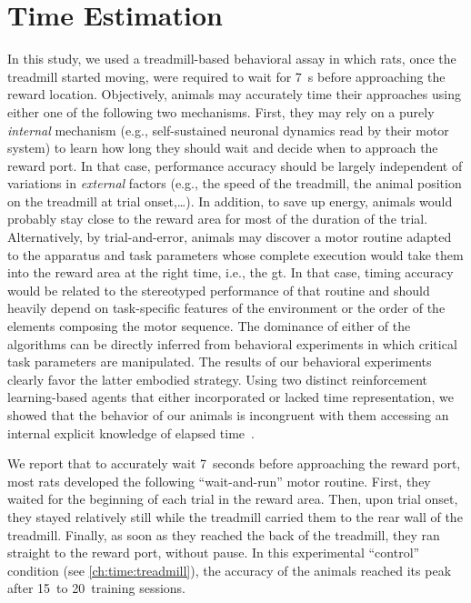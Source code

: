 \section{Time Estimation}
\label{ch:disscusion:time}

In this study, we used a treadmill-based behavioral assay in which rats, once the treadmill started moving, were required to wait for 7~s before approaching the reward location.
Objectively, animals may accurately time their approaches using either one of the following two mechanisms.
First, they may rely on a purely \textit{internal} mechanism (e.g., self-sustained neuronal dynamics read by their motor system) to learn how long they should wait and decide when to approach the reward port.
In that case, performance accuracy should be largely independent of variations in \textit{external} factors (e.g., the speed of the treadmill, the animal position on the treadmill at trial onset,\ldots).
In addition, to save up energy, animals would probably stay close to the reward area for most of the duration of the trial.
Alternatively, by trial-and-error, animals may discover a motor routine adapted to the apparatus and task parameters whose complete execution would take them into the reward area at the right time, i.e., the \gls{gt}.
In that case, timing accuracy would be related to the stereotyped performance of that routine and should heavily depend on task-specific features of the environment or the order of the elements composing the motor sequence.
The dominance of either of the algorithms can be directly inferred from behavioral experiments in which critical task parameters are manipulated.
The results of our behavioral experiments clearly favor the latter embodied strategy.
Using two distinct reinforcement learning-based agents that either incorporated or lacked time representation, we showed that the behavior of our animals is incongruent with them accessing an internal explicit knowledge of elapsed time~\cite{Safaie2020PNAS}.
\par
We report that to accurately wait 7~seconds before approaching the reward port, most rats developed the following ``wait-and-run'' motor routine.
First, they waited for the beginning of each trial in the reward area.
Then, upon trial onset, they stayed relatively still while the treadmill carried them to the rear wall of the treadmill.
Finally, as soon as they reached the back of the treadmill, they ran straight to the reward port, without pause.
In this experimental ``control'' condition (see \autoref{ch:time:treadmill}), the accuracy of the animals reached its peak after 15~to 20~training sessions.
